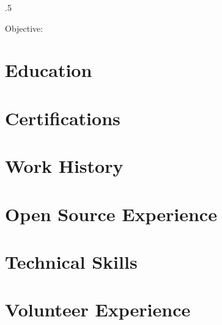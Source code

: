 \documentclass{res}
\begin{document}
 
\thispagestyle{empty} %
\address{}


\begin{resume}
\vspace{0.1in}
\moveleft.5\sectionwidth\centerline{Objective: }  

\section{Education}
\vspace{0.1in} 
	

\section{Certifications} 
\vspace{0.1in}
	

\section{Work History} 
    

\section{Open Source Experience} 
\vspace{0.1in} 
	

\section{Technical Skills} 
\vspace{0.1in}
	
	
	

\section{Volunteer Experience} 
\vspace{0.1in}
	

\end{resume}
\end{document}
